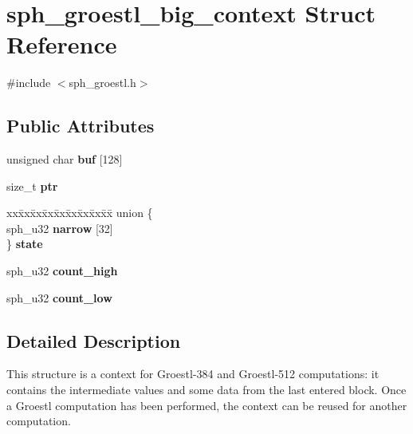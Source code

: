 \hypertarget{structsph__groestl__big__context}{}\section{sph\+\_\+groestl\+\_\+big\+\_\+context Struct Reference}
\label{structsph__groestl__big__context}


{\ttfamily \#include $<$sph\+\_\+groestl.\+h$>$}

\subsection*{Public Attributes}
\begin{DoxyCompactItemize}
\item 
\mbox{\label{structsph__groestl__big__context_af01cbebd23f3939991a330ab266ef32a}} 
unsigned char {\bfseries buf} \mbox{[}128\mbox{]}
\item 
\mbox{\label{structsph__groestl__big__context_a350d7b879c0cd13453089c2f9286b81e}} 
size\+\_\+t {\bfseries ptr}
\item 
\mbox{\label{structsph__groestl__big__context_a132f287c3646fc20fa4b3e39812319af}} 
\begin{tabbing}
xx\=xx\=xx\=xx\=xx\=xx\=xx\=xx\=xx\=\kill
union \{\\
\>sph\_u32 {\bfseries narrow} \mbox{[}32\mbox{]}\\
\} {\bfseries state}\\

\end{tabbing}\item 
\mbox{\label{structsph__groestl__big__context_a257c12985fd59be228db3df1c681c8b8}} 
sph\+\_\+u32 {\bfseries count\+\_\+high}
\item 
\mbox{\label{structsph__groestl__big__context_afbb1b7f2c1ccf37607aefe70af412155}} 
sph\+\_\+u32 {\bfseries count\+\_\+low}
\end{DoxyCompactItemize}


\subsection{Detailed Description}
This structure is a context for Groestl-\/384 and Groestl-\/512 computations\+: it contains the intermediate values and some data from the last entered block. Once a Groestl computation has been performed, the context can be reused for another computation.

